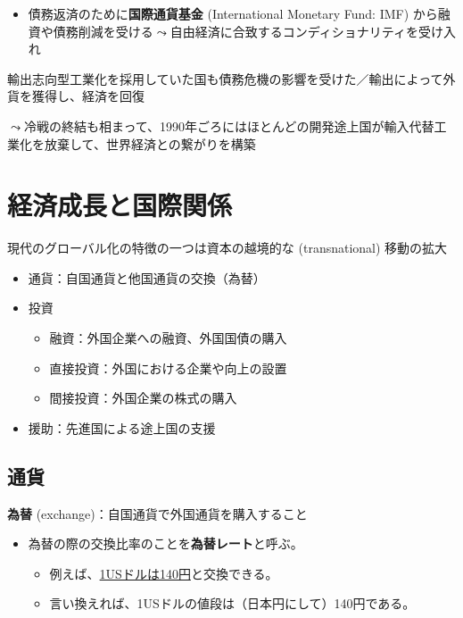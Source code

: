 \documentclass[
  xelatex,
  ja=standard]{bxjsarticle}
\providecommand{\tightlist}{%
  \setlength{\itemsep}{0pt}\setlength{\parskip}{0pt}}\usepackage{longtable,booktabs,array}
\begin{document}
\begin{itemize}
\tightlist
\item
  債務返済のために\textbf{国際通貨基金} (International Monetary Fund:
  IMF)
  から融資や債務削減を受ける\(\leadsto\)自由経済に合致するコンディショナリティを受け入れ
\end{itemize}

輸出志向型工業化を採用していた国も債務危機の影響を受けた／輸出によって外貨を獲得し、経済を回復

\(\leadsto\)冷戦の終結も相まって、1990年ごろにはほとんどの開発途上国が輸入代替工業化を放棄して、世界経済との繋がりを構築

\hypertarget{ux7d4cux6e08ux6210ux9577ux3068ux56fdux969bux95a2ux4fc2}{%
\section{経済成長と国際関係}\label{ux7d4cux6e08ux6210ux9577ux3068ux56fdux969bux95a2ux4fc2}}

現代のグローバル化の特徴の一つは資本の越境的な (transnational)
移動の拡大

\begin{itemize}
\tightlist
\item
  通貨：自国通貨と他国通貨の交換（為替）
\item
  投資

  \begin{itemize}
  \tightlist
  \item
    融資：外国企業への融資、外国国債の購入
  \item
    直接投資：外国における企業や向上の設置
  \item
    間接投資：外国企業の株式の購入
  \end{itemize}
\item
  援助：先進国による途上国の支援
\end{itemize}

\hypertarget{ux901aux8ca8}{%
\subsection{通貨}\label{ux901aux8ca8}}

\textbf{為替} (exchange)：自国通貨で外国通貨を購入すること

\begin{itemize}
\tightlist
\item
  為替の際の交換比率のことを\textbf{為替レート}と呼ぶ。

  \begin{itemize}
  \tightlist
  \item
    例えば、\href{https://info.finance.yahoo.co.jp/fx/convert/}{1USドルは140円}と交換できる。
  \item
    言い換えれば、1USドルの値段は（日本円にして）140円である。
  \end{itemize}
\end{itemize}
\end{document}
